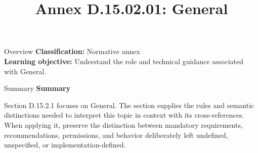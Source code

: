 \documentclass[10pt,letterpaper]{article}
\title{Annex D.15.02.01: General}
\author{}
\date{}
\begin{document}
\maketitle
\begin{CornellOverviewBox}{Overview}
\textbf{Classification:} Normative annex\\[2pt]
\textbf{Learning objective:} Understand the role and technical guidance associated with General.
\end{CornellOverviewBox}\begin{CornellSummaryBox}{Summary}
{\sffamily\bfseries\color{Accent} Summary}\par\vspace{3pt}Section D.15.2.1 focuses on General. The section supplies the rules and semantic distinctions needed to interpret this topic in context with its cross-references. When applying it, preserve the distinction between mandatory requirements, recommendations, permissions, and behavior deliberately left undefined, unspecified, or implementation-defined.
\end{CornellSummaryBox}
\end{document}

